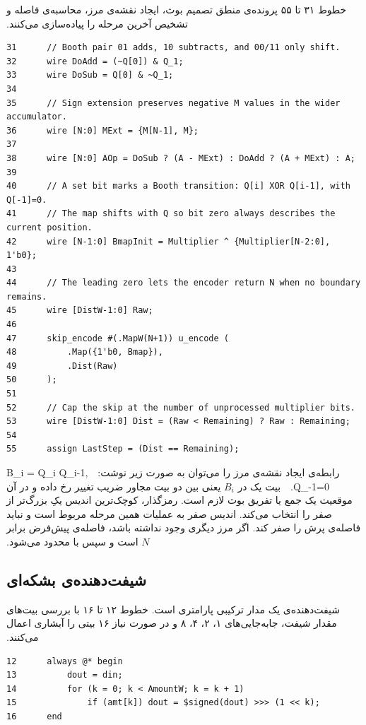 ‫
‫خطوط ۳۱ تا ۵۵ پرونده‌ی  منطق تصمیم بوث، ایجاد نقشه‌ی مرز، محاسبه‌ی
‫فاصله و تشخیص آخرین مرحله را پیاده‌سازی می‌کنند.
‫
\begin{dsdlcodeblock}
\begin{verbatim}
31      // Booth pair 01 adds, 10 subtracts, and 00/11 only shift.
32      wire DoAdd = (~Q[0]) & Q_1;
33      wire DoSub = Q[0] & ~Q_1;
34
35      // Sign extension preserves negative M values in the wider accumulator.
36      wire [N:0] MExt = {M[N-1], M};
37
38      wire [N:0] AOp = DoSub ? (A - MExt) : DoAdd ? (A + MExt) : A;
39
40      // A set bit marks a Booth transition: Q[i] XOR Q[i-1], with Q[-1]=0.
41      // The map shifts with Q so bit zero always describes the current position.
42      wire [N-1:0] BmapInit = Multiplier ^ {Multiplier[N-2:0], 1'b0};
43
44      // The leading zero lets the encoder return N when no boundary remains.
45      wire [DistW-1:0] Raw;
46
47      skip_encode #(.MapW(N+1)) u_encode (
48          .Map({1'b0, Bmap}),
49          .Dist(Raw)
50      );
51
52      // Cap the skip at the number of unprocessed multiplier bits.
53      wire [DistW-1:0] Dist = (Raw < Remaining) ? Raw : Remaining;
54
55      assign LastStep = (Dist == Remaining);
\end{verbatim}
\end{dsdlcodeblock}
‫
‫رابطه‌ی ایجاد نقشه‌ی مرز را می‌توان به صورت زیر نوشت:
‫
‫
‫B_i = Q_i \oplus Q_{i-1}, \qquad Q_{-1}=0.
‫
‫
‫بیت یک در $B_i$ یعنی بین دو بیت مجاور ضریب تغییر رخ داده و در آن موقعیت یک جمع یا تفریق
‫بوث لازم است. رمزگذار، کوچک‌ترین اندیس یکِ بزرگ‌تر از صفر را انتخاب می‌کند. اندیس صفر به
‫عملیات همین مرحله مربوط است و نباید فاصله‌ی پرش را صفر کند. اگر مرز دیگری وجود نداشته باشد،
‫فاصله‌ی پیش‌فرض برابر $N$ است و سپس با  محدود می‌شود.
‫
‫
‫\subsection{شیفت‌دهنده‌ی بشکه‌ای}
‫
‫شیفت‌دهنده‌ی  یک مدار ترکیبی پارامتری است. خطوط ۱۲ تا ۱۶ با بررسی
‫بیت‌های مقدار شیفت، جابه‌جایی‌های ۱، ۲، ۴، ۸ و در صورت نیاز ۱۶ بیتی را آبشاری اعمال می‌کنند.
‫
\begin{dsdlcodeblock}
\begin{verbatim}
12      always @* begin
13          dout = din;
14          for (k = 0; k < AmountW; k = k + 1)
15              if (amt[k]) dout = $signed(dout) >>> (1 << k);
16      end
\end{verbatim}
\end{dsdlcodeblock}

